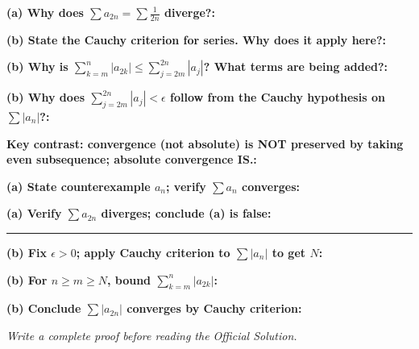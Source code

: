 \documentclass[12pt]{article}
\newcommand{\fillfield}[1]{%
  \par\noindent\textbf{#1:}\enspace\hrulefill\par\vspace{3pt}%
}
\newcommand{\writespace}[1]{\vspace{#1}}
\begin{document}
\bigskip

\begin{tcolorbox}[
  enhanced, breakable,
  colback  = pass3orange,
  colframe = orange!65!black,
  fonttitle = \bfseries,
  title = {Pass 3 \enspace\textbf{--}\enspace Self-Explanation}
]
\fillfield{(a) Why does $\sum a_{2n} = \sum \frac{1}{2n}$ diverge?}
\fillfield{(b) State the Cauchy criterion for series. Why does it apply here?}
\fillfield{(b) Why is $\sum_{k=m}^n |a_{2k}| \leq \sum_{j=2m}^{2n} |a_j|$? What terms are being added?}
\fillfield{(b) Why does $\sum_{j=2m}^{2n} |a_j| < \epsilon$ follow from the Cauchy hypothesis on $\sum |a_n|$?}
\fillfield{Key contrast: convergence (not absolute) is NOT preserved by taking even subsequence; absolute convergence IS.}
\end{tcolorbox}

\newpage

\begin{tcolorbox}[
  enhanced, breakable,
  colback  = pass4purple,
  colframe = purple!55!black,
  fonttitle = \bfseries,
  title = {Pass 4 \enspace\textbf{--}\enspace Skeleton Proof}
]
\noindent\textbf{(a) State counterexample $a_n$; verify $\sum a_n$ converges:}\par
\writespace{1.4cm}
\noindent\textbf{(a) Verify $\sum a_{2n}$ diverges; conclude (a) is false:}\par
\writespace{1.4cm}

\noindent\rule{\linewidth}{0.4pt}\vspace{2pt}

\noindent\textbf{(b) Fix $\epsilon > 0$; apply Cauchy criterion to $\sum |a_n|$ to get $N$:}\par
\writespace{1.4cm}
\noindent\textbf{(b) For $n \geq m \geq N$, bound $\sum_{k=m}^n |a_{2k}|$:}\par
\writespace{1.8cm}
\noindent\textbf{(b) Conclude $\sum |a_{2n}|$ converges by Cauchy criterion:}\par
\writespace{1.0cm}
\end{tcolorbox}

\newpage

\begin{tcolorbox}[
  enhanced, breakable,
  colback  = pass5gray,
  colframe = black!38,
  fonttitle = \bfseries,
  title = {Pass 5 \enspace\textbf{--}\enspace Full Proof Attempt}
]
\small\itshape Write a complete proof before reading the Official Solution.\par
\normalfont\normalsize
\writespace{19cm}
\end{tcolorbox}
\end{document}
